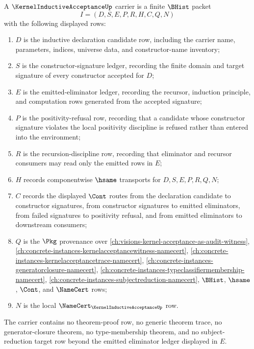 \begin{definition}
\label{def:kernel-inductive-acceptance-carrier}
A $\KernelInductiveAcceptanceUp$ carrier is a finite $\BHist$ packet
$$
I=(D,S,E,P,R,H,C,Q,N)
$$
with the following displayed rows:
\begin{enumerate}
\item $D$ is the inductive declaration candidate row, including the carrier name, parameters, indices, universe data, and constructor-name inventory;
\item $S$ is the constructor-signature ledger, recording the finite domain and target signature of every constructor accepted for $D$;
\item $E$ is the emitted-eliminator ledger, recording the recursor, induction principle, and computation rows generated from the accepted signature;
\item $P$ is the positivity-refusal row, recording that a candidate whose constructor signature violates the local positivity discipline is refused rather than entered into the environment;
\item $R$ is the recursion-discipline row, recording that eliminator and recursor consumers may read only the emitted rows in $E$;
\item $H$ records componentwise $\hsame$ transports for $D,S,E,P,R,Q,N$;
\item $C$ records the displayed $\Cont$ routes from the declaration candidate to constructor signatures, from constructor signatures to emitted eliminators, from failed signatures to positivity refusal, and from emitted eliminators to downstream consumers;
\item $Q$ is the $\Pkg$ provenance over \autoref{ch:visions-kernel-acceptance-as-audit-witness}, \autoref{ch:concrete-instances-kernelacceptancewitness-namecert}, \autoref{ch:concrete-instances-kernelacceptancetrace-namecert}, \autoref{ch:concrete-instances-generatorclosure-namecert}, \autoref{ch:concrete-instances-typeclassifiermembership-namecert}, \autoref{ch:concrete-instances-subjectreduction-namecert}, $\BHist$, $\hsame$, $\Cont$, and $\NameCert$ rows;
\item $N$ is the local $\NameCert_{\KernelInductiveAcceptanceUp}$ row.
\end{enumerate}
The carrier contains no theorem-proof row, no generic theorem trace, no generator-closure theorem, no type-membership theorem, and no subject-reduction target row beyond the emitted eliminator ledger displayed in $E$.
\end{definition}


